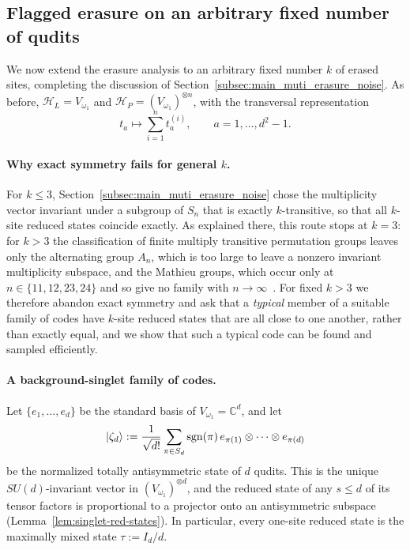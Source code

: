 \documentclass[10pt,twocolumn,superscriptaddress,aps,amsmath,amssymb,citeautoscript,floatfix,prx]{revtex4-2}
\theoremstyle{plain}
\theoremstyle{plain}
\theoremstyle{plain}
\theoremstyle{plain}
\theoremstyle{plain}
\theoremstyle{plain}
\theoremstyle{plain}
\theoremstyle{definition}
\theoremstyle{plain}
\begin{document}
\subsection{Flagged erasure on an arbitrary fixed number of qudits}\label{subsec:main_multisite_erasure_noise}

We now extend the erasure analysis to an arbitrary fixed number $k$ of erased sites, completing the discussion of Section~\ref{subsec:main_muti_erasure_noise}. 
As before, $\mathcal H_L=V_{\omega_1}$ and $\mathcal H_P=(V_{\omega_1})^{\otimes n}$, with the transversal representation
$$
t_a
\longmapsto
\sum_{i=1}^n t_a^{(i)},
\qquad
a=1,\ldots,d^2-1.
$$

\paragraph{Why exact symmetry fails for general $k$.}

For $k\le3$, Section~\ref{subsec:main_muti_erasure_noise} chose the multiplicity vector invariant under a subgroup of $S_n$ 
that is exactly $k$-transitive, so that all $k$-site reduced states coincide exactly. As explained there, this route stops at $k=3$: 
for $k>3$ the classification of finite multiply transitive permutation groups leaves only the alternating group $A_n$, 
which is too large to leave a nonzero invariant multiplicity subspace, and the Mathieu groups, which occur only at $n\in\{11,12,23,24\}$ and so give no family with $n\to\infty$~\cite{GorensteinLyonsSolomon1994}. 
For fixed $k>3$ we therefore abandon exact symmetry and ask that a \emph{typical} member of a suitable family of codes have $k$-site reduced states that are all close to one another, 
rather than exactly equal, and we show that such a typical code can be found and sampled efficiently.

\paragraph{A background-singlet family of codes.}

Let $\{e_1,\ldots,e_d\}$ be the standard basis of $V_{\omega_1}=\mathbb C^d$, and let
$$
\ket{\zeta_d}
:=
\frac1{\sqrt{d!}}
\sum_{\pi\in S_d}
\operatorname{sgn}(\pi)\,
e_{\pi(1)}\otimes\cdots\otimes e_{\pi(d)}
$$
be the normalized totally antisymmetric state of $d$ qudits. This is the unique $SU(d)$-invariant vector in $(V_{\omega_1})^{\otimes d}$, 
and the reduced state of any $s\le d$ of its tensor factors is proportional to a projector onto an antisymmetric subspace (Lemma~\ref{lem:singlet-red-states}). 
In particular, every one-site reduced state is the maximally mixed state $\tau:=I_d/d$.
\end{document}
